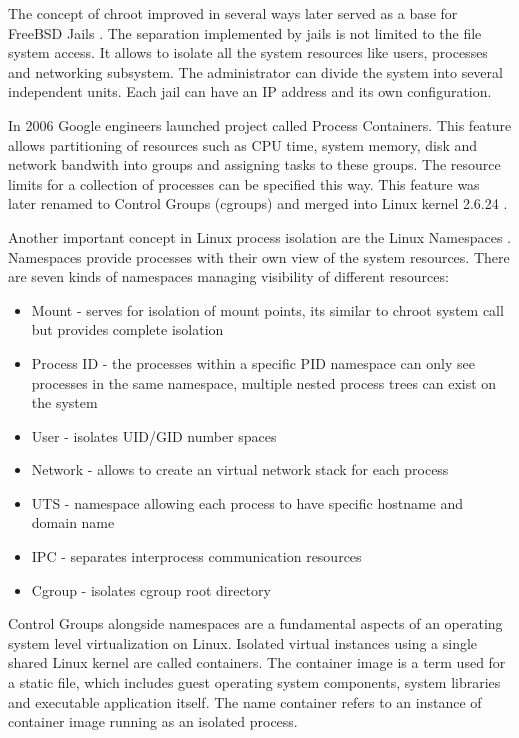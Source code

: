 \documentclass[
  digital, %
  twoside, %
  table,   %
  lof,     %
  lot,     %
]{fithesis3}
\begin{document}
The concept of chroot improved in several ways later served as a base for FreeBSD Jails \cite{freebsd_jails}. The separation implemented by jails is not limited to the file system access. It allows to isolate all the system resources like users, processes and networking subsystem. The administrator can divide the system into several independent units. Each jail can have an IP address and its own configuration.

In 2006 Google engineers launched project called Process Containers. This feature allows partitioning of resources such as CPU time, system memory, disk and network bandwith into groups and assigning tasks to these groups. The resource limits for a collection of processes can be specified this way. This feature was later renamed to Control Groups (cgroups) and merged into Linux kernel 2.6.24 \cite{cgroups}.

Another important concept in Linux process isolation are the Linux Namespaces \cite{namespaces}. Namespaces provide processes with their own view of the system resources. There are seven kinds of namespaces managing visibility of different resources:
\begin{itemize}
  \item Mount - serves for isolation of mount points, its similar to chroot system call but provides complete isolation
  \item Process ID - the processes within a specific PID namespace can only see processes in the same namespace, multiple nested process trees can exist on the system
  \item User - isolates UID/GID number spaces
  \item Network - allows to create an virtual network stack for each process
  \item UTS - namespace allowing each process to have specific hostname and domain name
  \item IPC - separates interprocess communication resources
  \item Cgroup - isolates cgroup root directory
\end{itemize}

Control Groups alongside namespaces are a fundamental aspects of an operating system level virtualization on Linux. Isolated virtual instances using a single shared Linux kernel are called containers. The container image is a term used for a static file, which includes guest operating system components, system libraries and executable application itself. The name container refers to an instance of container image running as an isolated process.
\end{document}
